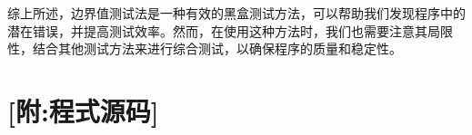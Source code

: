 \documentclass{article}
\newcommand{\rust}{/home/kevin/Documents/rust/tesxsthw1/src/main.rs}
\newcommand{\bash}{/home/kevin/Documents/rust/tesxsthw1/src/test.sh}
\begin{document}
综上所述，边界值测试法是一种有效的黑盒测试方法，可以帮助我们发现程序中的潜在错误，并提高测试效率。然而，在使用这种方法时，我们也需要注意其局限性，结合其他测试方法来进行综合测试，以确保程序的质量和稳定性。\\

\section{[附:程式源码]}






\renewcommand{\rust}{/home/kevin/Documents/rust/tesxsthw2/src/main.rs}
\renewcommand{\bash}{/home/kevin/Documents/rust/tesxsthw2/src/test.sh}




\end{document}

